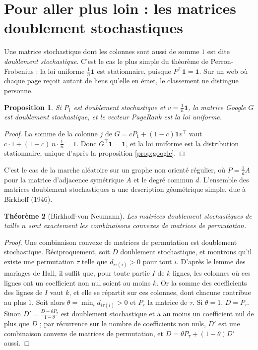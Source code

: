 \documentclass[11pt,a4paper]{article}
\theoremstyle{plain}
\newtheorem{theoreme}{Théorème}[section]
\newtheorem{proposition}[theoreme]{Proposition}
\theoremstyle{definition}
\theoremstyle{remark}
\newcommand{\un}{\mathbf{1}}
\begin{document}
\section{Pour aller plus loin : les matrices doublement stochastiques}

Une matrice stochastique dont les colonnes sont aussi de somme $1$ est dite \emph{doublement stochastique}. C'est le cas le plus simple du théorème de Perron-Frobenius : la loi uniforme $\frac1n\un$ est stationnaire, puisque $P^\top\un=\un$. Sur un web où chaque page reçoit autant de liens qu'elle en émet, le classement ne distingue personne.

\begin{proposition}\label{prop:double}
Si $P_1$ est doublement stochastique et $v=\frac1n\un$, la matrice Google $G$ est doublement stochastique, et le vecteur PageRank est la loi uniforme.
\end{proposition}

\begin{proof}
La somme de la colonne $j$ de $G=cP_1+(1-c)\un v^\top$ vaut $c\cdot1+(1-c)\,n\cdot\frac1n=1$. Donc $G^\top\un=\un$, et la loi uniforme est la distribution stationnaire, unique d'après la proposition \ref{prop:google}.
\end{proof}

C'est le cas de la marche aléatoire sur un graphe non orienté régulier, où $P=\frac1dA$ pour la matrice d'adjacence symétrique $A$ et le degré commun $d$. L'ensemble des matrices doublement stochastiques a une description géométrique simple, due à Birkhoff (1946).

\begin{theoreme}[Birkhoff-von Neumann]\label{thm:birkhoff}
Les matrices doublement stochastiques de taille $n$ sont exactement les combinaisons convexes de matrices de permutation.
\end{theoreme}

\begin{proof}
Une combinaison convexe de matrices de permutation est doublement stochastique. Réciproquement, soit $D$ doublement stochastique, et montrons qu'il existe une permutation $\tau$ telle que $d_{i\tau(i)}>0$ pour tout $i$. D'après le lemme des mariages de Hall, il suffit que, pour toute partie $I$ de $k$ lignes, les colonnes où ces lignes ont un coefficient non nul soient au moins $k$. Or la somme des coefficients des lignes de $I$ vaut $k$, et elle se répartit sur ces colonnes, dont chacune contribue au plus $1$. Soit alors $\theta=\min_id_{i\tau(i)}>0$ et $P_\tau$ la matrice de $\tau$. Si $\theta=1$, $D=P_\tau$. Sinon $D'=\frac{D-\theta P_\tau}{1-\theta}$ est doublement stochastique et a au moins un coefficient nul de plus que $D$ ; par récurrence sur le nombre de coefficients non nuls, $D'$ est une combinaison convexe de matrices de permutation, et $D=\theta P_\tau+(1-\theta)D'$ aussi.
\end{proof}
\end{document}
